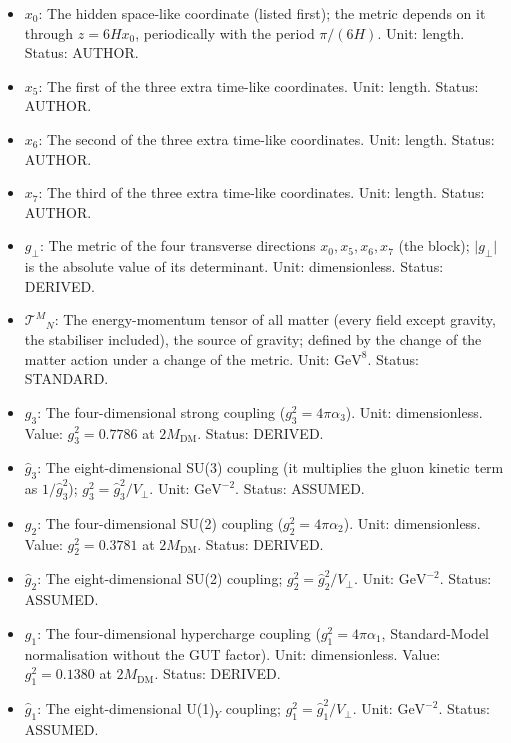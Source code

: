 \documentclass[
  10pt,
]{article}
\begin{document}
\begin{itemize}
  variables. Status: STANDARD.
\item
  \(x_0\): The hidden space-like coordinate (listed first); the metric
  depends on it through \(z = 6Hx_0\), periodically with the period
  \(\pi/(6H)\). Unit: length. Status: AUTHOR.
\item
  \(x_5\): The first of the three extra time-like coordinates. Unit:
  length. Status: AUTHOR.
\item
  \(x_6\): The second of the three extra time-like coordinates. Unit:
  length. Status: AUTHOR.
\item
  \(x_7\): The third of the three extra time-like coordinates. Unit:
  length. Status: AUTHOR.
\item
  \(g_\perp\): The metric of the four transverse directions
  \(x_0, x_5, x_6, x_7\) (the block); \(\lvert g_\perp\rvert\) is the
  absolute value of its determinant. Unit: dimensionless. Status:
  DERIVED.
\item
  \(\mathcal{T}^M{}_N\): The energy-momentum tensor of all matter (every
  field except gravity, the stabiliser included), the source of gravity;
  defined by the change of the matter action under a change of the
  metric. Unit: \(\mathrm{GeV}^{8}\). Status: STANDARD.
\item
  \(g_3\): The four-dimensional strong coupling
  (\(g_3^2 = 4\pi\alpha_3\)). Unit: dimensionless. Value:
  \(g_3^2 = 0.7786\) at \(2M_{\mathrm{DM}}\). Status: DERIVED.
\item
  \(\hat g_3\): The eight-dimensional SU(3) coupling (it multiplies the
  gluon kinetic term as \(1/\hat g_3^2\));
  \(g_3^2 = \hat g_3^2/V_\perp\). Unit: \(\mathrm{GeV}^{-2}\). Status:
  ASSUMED.
\item
  \(g_2\): The four-dimensional SU(2) coupling
  (\(g_2^2 = 4\pi\alpha_2\)). Unit: dimensionless. Value:
  \(g_2^2 = 0.3781\) at \(2M_{\mathrm{DM}}\). Status: DERIVED.
\item
  \(\hat g_2\): The eight-dimensional SU(2) coupling;
  \(g_2^2 = \hat g_2^2/V_\perp\). Unit: \(\mathrm{GeV}^{-2}\). Status:
  ASSUMED.
\item
  \(g_1\): The four-dimensional hypercharge coupling
  (\(g_1^2 = 4\pi\alpha_1\), Standard-Model normalisation without the
  GUT factor). Unit: dimensionless. Value: \(g_1^2 = 0.1380\) at
  \(2M_{\mathrm{DM}}\). Status: DERIVED.
\item
  \(\hat g_1\): The eight-dimensional U(1)\(_Y\) coupling;
  \(g_1^2 = \hat g_1^2/V_\perp\). Unit: \(\mathrm{GeV}^{-2}\). Status:
  ASSUMED.
\end{itemize}
\end{document}

